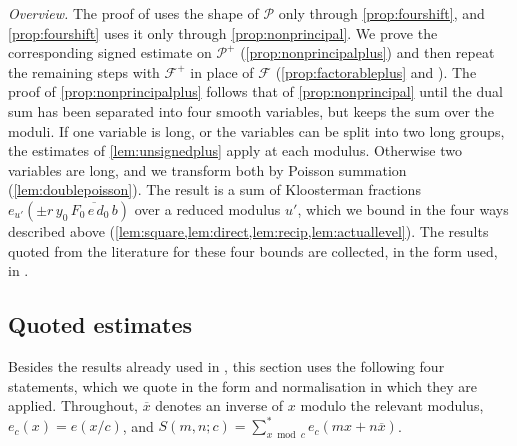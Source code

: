\documentclass[11pt,colorlinks]{charlie}
\begin{document}
\emph{Overview.} The proof of  uses the shape of $\mathcal P$ only through \cref{prop:fourshift}, and \cref{prop:fourshift} uses it only through \cref{prop:nonprincipal}. We prove the corresponding signed estimate on $\mathcal P^+$ (\cref{prop:nonprincipalplus}) and then repeat the remaining steps with $\mathcal F^+$ in place of $\mathcal F$ (\cref{prop:factorableplus} and ). The proof of \cref{prop:nonprincipalplus} follows that of \cref{prop:nonprincipal} until the dual sum has been separated into four smooth variables, but keeps the sum over the moduli. If one variable is long, or the variables can be split into two long groups, the estimates of \cref{lem:unsignedplus} apply at each modulus. Otherwise two variables are long, and we transform both by Poisson summation (\cref{lem:doublepoisson}). The result is a sum of Kloosterman fractions $e_{u'}(\pm r\,y_0\,\overline{F_0\,e\,d_0\,b})$ over a reduced modulus $u'$, which we bound in the four ways described above (\cref{lem:square,lem:direct,lem:recip,lem:actuallevel}). The results quoted from the literature for these four bounds are collected, in the form used, in .

\subsection{Quoted estimates}\label{ssec:quoted}
Besides the results already used in , this section uses the following four statements, which we quote in the form and normalisation in which they are applied. Throughout, $\overline x$ denotes an inverse of $x$ modulo the relevant modulus, $e_c(x)=e(x/c)$, and $S(m,n;c)=\sum^*_{x\bmod c}e_c(mx+n\overline x)$.
\end{document}
